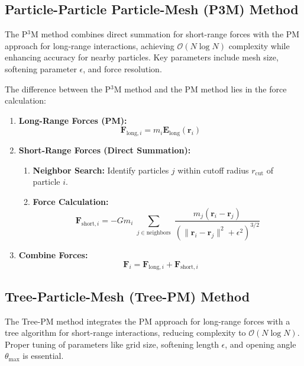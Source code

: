 \subsection{Particle-Particle Particle-Mesh (P3M) Method}
The P$^3$M method combines direct summation for short-range forces with the PM approach for long-range interactions, achieving $\mathcal{O}(N \log N)$ complexity while enhancing accuracy for nearby particles. Key parameters include mesh size, softening parameter $\epsilon$, and force resolution.

The difference between the P$^3$M method and the PM method lies in the force calculation:
\begin{enumerate}
    \item \textbf{Long-Range Forces (PM):}
    \[
    \mathbf{F}_{\text{long},i} = m_i \mathbf{E}_{\text{long}}(\mathbf{r}_i)
    \]
    \item \textbf{Short-Range Forces (Direct Summation):}
    \begin{enumerate}[label={(\alph*)}]
        \item \textbf{Neighbor Search:}
        Identify particles $j$ within cutoff radius $r_{\text{cut}}$ of particle $i$.
        \item \textbf{Force Calculation:}
        \[
        \mathbf{F}_{\text{short},i} = -G m_i \sum_{\substack{j \in \text{neighbors}}} \frac{m_j (\mathbf{r}_i - \mathbf{r}_j)}{\left(\|\mathbf{r}_i - \mathbf{r}_j\|^2 + \epsilon^2\right)^{3/2}}
        \]
    \end{enumerate}
    \item \textbf{Combine Forces:}
    \[
    \mathbf{F}_i = \mathbf{F}_{\text{long},i} + \mathbf{F}_{\text{short},i}
    \]
\end{enumerate}

\subsection{Tree-Particle-Mesh (Tree-PM) Method}
The Tree-PM method integrates the PM approach for long-range forces with a tree algorithm for short-range interactions, reducing complexity to $\mathcal{O}(N \log N)$. Proper tuning of parameters like grid size, softening length $\epsilon$, and opening angle $\theta_{\text{max}}$ is essential.

